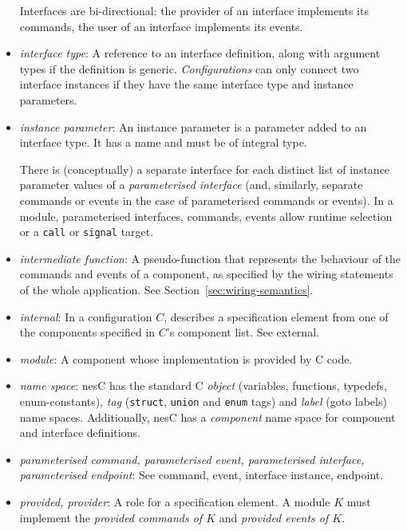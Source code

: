 \documentclass[11pt,letterpaper]{article}
\newcommand{\kw}[1]{{\tt #1}}
\newcommand{\code}[1]{{\tt #1}}
\newcommand{\nesc}{nesC\xspace}
\begin{document}
\begin{itemize}
Interfaces are bi-directional: the provider of an interface implements its
commands, the user of an interface implements its events.

\item \emph{interface type}: A reference to an interface definition, along
with argument types if the definition is generic. \emph{Configurations} can
only connect two interface instances if they have the same interface type
and instance parameters.

\item \emph{instance parameter}: An instance parameter is a parameter added
to an interface type. It has a name and must be of integral type.

There is (conceptually) a separate interface for each distinct list of
instance parameter values of a \emph{parameterised interface} (and,
similarly, separate commands or events in the case of parameterised
commands or events). In a module, parameterised interfaces, commands,
events allow runtime selection or a \kw{call} or \kw{signal} target.

\item \emph{intermediate function}: A pseudo-function that represents the
behaviour of the commands and events of a component, as specified by the
wiring statements of the whole application. See
Section~\ref{sec:wiring-semantics}.

\item \emph{internal}: In a configuration $C$, describes a specification
element from one of the components specified in $C$'s component list. See
external.

\item \emph{module}: A component whose implementation is provided by C
code. 

\item \emph{name space}: \nesc has the standard C \emph{object} (variables,
functions, typedefs, enum-constants), \emph{tag} (\code{struct},
\code{union} and \code{enum} tags) and \emph{label} (goto labels)
name spaces. Additionally, \nesc has a \emph{component} name space for
component and interface definitions.

\item \emph{parameterised command, parameterised event, parameterised
interface, parameterised endpoint}: See command, event, interface instance,
endpoint.

\item \emph{provided, provider}: A role for a specification
element. A module $K$ must implement the \emph{provided commands of $K$}
and \emph{provided events of $K$}.


\end{itemize}
\end{document}
